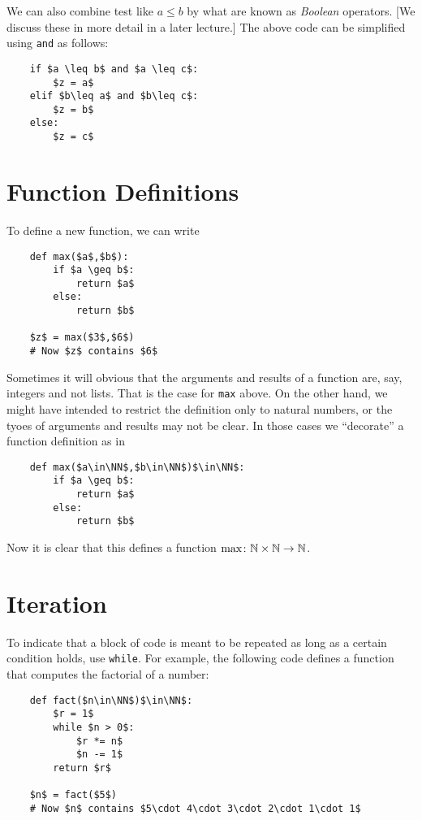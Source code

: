 We can also combine test like $a\leq b$ by what are known as \emph{Boolean}
operators. [We discuss these in more detail in a later lecture.] The
above code can be simplified using \lstinline|and| as follows:
\begin{code}
	\begin{lstlisting}
	if $a \leq b$ and $a \leq c$: 
		$z = a$
	elif $b\leq a$ and $b\leq c$: 
		$z = b$ 
	else: 
		$z = c$
	\end{lstlisting}
\end{code}

\section{Function Definitions}

To define a new function, we can write
\begin{code}
	\begin{lstlisting}
	def max($a$,$b$):
		if $a \geq b$:
			return $a$
		else:
			return $b$
	
	$z$ = max($3$,$6$)
	# Now $z$ contains $6$
	\end{lstlisting}
\end{code}

Sometimes it will obvious that the arguments and results of a function are, say, integers and not lists. That is the case for \lstinline|max| above. On the other hand, we might have intended to restrict the definition only to natural numbers, or the tyoes of arguments and results may not be clear. In those cases we ``decorate'' a function definition as in

\begin{code}
	\begin{lstlisting}
	def max($a\in\NN$,$b\in\NN$)$\in\NN$:
		if $a \geq b$:
			return $a$
		else:
			return $b$
	\end{lstlisting}
\end{code}
Now it is clear that this defines a function $\fromto {\lstinline|max|}{\NN\times\NN}\NN$.
\ipadbreak

\section{Iteration}

To indicate that a block of code is meant to be repeated as long as a certain condition holds, use \lstinline|while|.
For example, the following code defines a function that computes the factorial of a number:
\begin{code}
	\begin{lstlisting}
	def fact($n\in\NN$)$\in\NN$:
		$r = 1$
		while $n > 0$:
			$r *= n$
			$n -= 1$
		return $r$ 
	
	$n$ = fact($5$) 
	# Now $n$ contains $5\cdot 4\cdot 3\cdot 2\cdot 1\cdot 1$ 
	\end{lstlisting}
\end{code}

